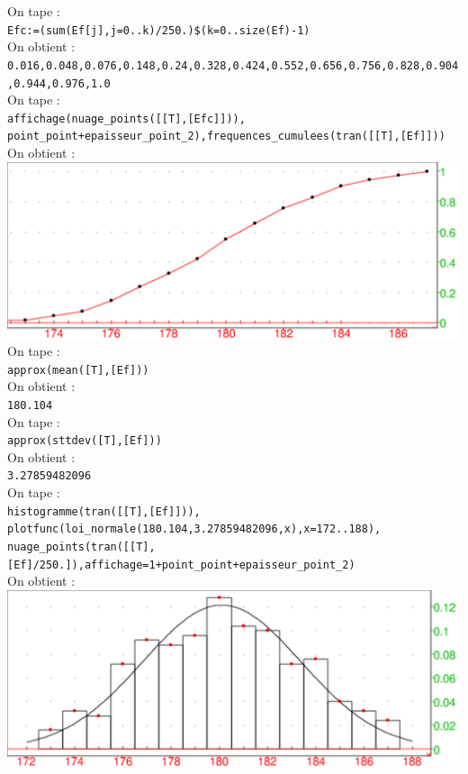 \documentclass[a4paper,11pt]{book}
\begin{document}
On tape :\\
{\tt Efc:=(sum(Ef[j],j=0..k)/250.)\$(k=0..size(Ef)-1)}\\
On obtient :\\
{\tt 0.016,0.048,0.076,0.148,0.24,0.328,0.424,0.552,0.656,0.756,0.828,0.904,0.944,0.976,1.0}\\
On tape :\\
{\tt affichage(nuage\_points([[T],[Efc]])), point\_point+epaisseur\_point\_2),frequences\_cumulees(tran([[T],[Ef]]))}\\
On obtient :\\
\includegraphics[width=\textwidth]{statfreq}\\
On tape :\\
{\tt approx(mean([T],[Ef]))}\\
On obtient :\\
{\tt 180.104}\\
On tape :\\
{\tt approx(sttdev([T],[Ef]))}\\
On obtient :\\
{\tt 3.27859482096}\\
On tape :\\
{\tt histogramme(tran([[T],[Ef]])),\\
plotfunc(loi\_normale(180.104,3.27859482096,x),x=172..188),\\
nuage\_points(tran([[T],[Ef]/250.]),affichage=1+point\_point+epaisseur\_point\_2)}\\
On obtient :\\
\includegraphics[width=\textwidth]{statnormal}
\end{document}
